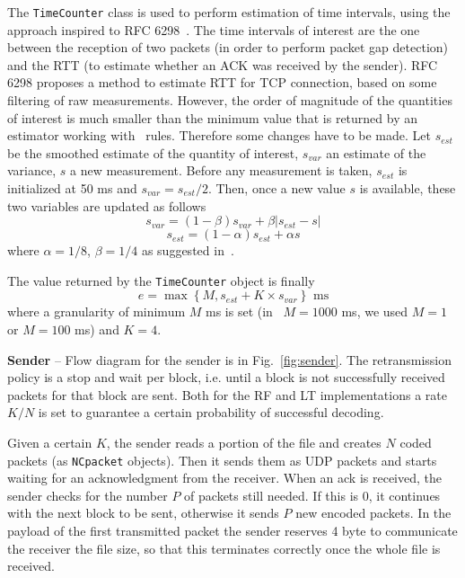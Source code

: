 The \texttt{TimeCounter} class is used to perform estimation of time intervals, using the approach inspired to RFC 6298~\cite{rfc6298}. The time intervals of interest are the one between the reception of two packets (in order to perform packet gap detection) and the RTT (to estimate whether an ACK was received by the sender). RFC 6298 proposes a method to estimate RTT for TCP connection, based on some filtering of raw measurements. However, the order of magnitude of the quantities of interest is much smaller than the minimum value that is returned by an estimator working with~\cite{rfc6298} rules. Therefore some changes have to be made. Let $s_{est}$ be the smoothed estimate of the quantity of interest, $s_{var}$ an estimate of the variance, $s$ a new measurement. Before any measurement is taken, $s_{est}$ is initialized at 50 ms and $s_{var} = s_{est}/2$. Then, once a new value $s$ is available, these two variables are updated as follows
\begin{equation}
	s_{var} = (1-\beta) s_{var}  + \beta |s_{est} - s|
\end{equation}
\begin{equation}
	s_{est} = (1 - \alpha) s_{est} + \alpha s
\end{equation}
where $\alpha = 1/8$, $\beta = 1/4$ as suggested in~\cite{rfc6298}.

The value returned by the \texttt{TimeCounter} object is finally
\begin{equation}
	e = \max\left\{M, s_{est} + K\times s_{var}  \right\} \mbox{ ms}
\end{equation}
where a granularity of minimum $M$ ms is set (in~\cite{rfc6298} $M = 1000$ ms, we used $M = 1$ or $M=100$ ms) and $K = 4$. 

\textbf{Sender} -- Flow diagram for the sender is in Fig.~\ref{fig:sender}. The retransmission policy is a stop and wait per block, i.e. until a block is not successfully received packets for that block are sent. Both for the RF and LT implementations a rate $K/N$ is set to guarantee a certain probability of successful decoding. 

Given a certain $K$, the sender reads a portion of the file and creates $N$ coded packets (as \texttt{NCpacket} objects). Then it sends them as UDP packets and starts waiting for an acknowledgment from the receiver. When an ack is received, the sender checks for the number $P$ of packets still needed. If this is 0, it continues with the next block to be sent, otherwise it sends $P$ new encoded packets. In the payload of the first transmitted packet the sender reserves 4 byte to communicate the receiver the file size, so that this terminates correctly once the whole file is received. 

